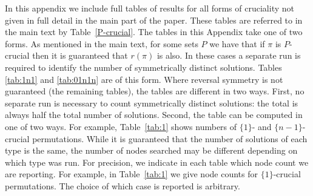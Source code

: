 \documentclass[12pt,reqno]{article}
\begin{document}
In this appendix we include full tables of results for all forms of cruciality not given in full detail in the main part of the paper.   
These tables are referred to in the main text by Table~\ref{P-crucial}. The tables in this Appendix take one of two forms.
As mentioned in the main text, for some sets $P$ we have that if $\pi$ is $P$-crucial then it is guaranteed that $r(\pi)$ is also.  In these cases a separate run is required to identify the number of symmetrically distinct solutions.  Tables \ref{tab:1n1} and \ref{tab:01n1n} are of this form.   
Where reversal symmetry is not guaranteed (the remaining tables), the tables are different in two ways.  
First, no separate run is necessary to count symmetrically distinct solutions: the total is always half the total number of solutions.  Second, the table can be computed in one of two ways.   For example, Table~\ref{tab:1} shows numbers of 
$\{1\}$- and $\{n-1\}$-crucial permutations.   While it is guaranteed that the number of solutions of each type is the same, the number of nodes searched may be different depending on which type was run.  For precision, we indicate in each table which node count we are reporting.  For example, in  Table~\ref{tab:1}  we give node counts for $\{1\}$-crucial permutations.   The choice of which case is reported is arbitrary.   
\end{document}
